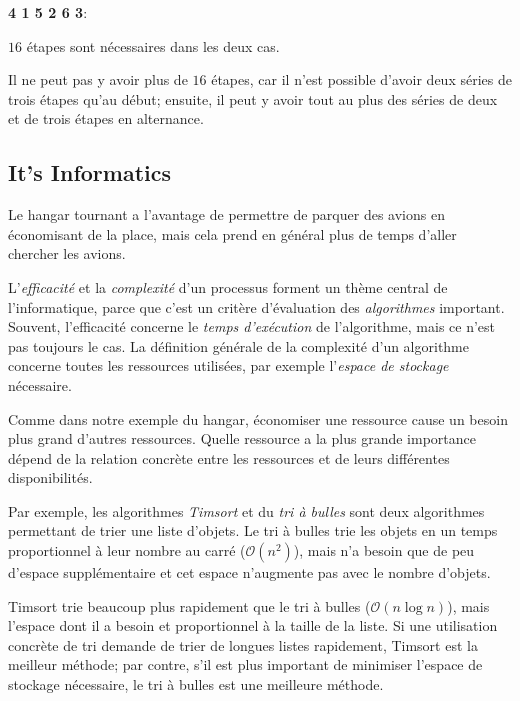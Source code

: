 \documentclass[a4paper,11pt]{report}
\newcommand{\taskGraphicsFolder}{..}
\begin{document}
\textbf{4 1 5 2 6 3}:

{\centering%
\par}

$16$ étapes sont nécessaires dans les deux cas.

Il ne peut pas y avoir plus de $16$ étapes, car il n’est possible d’avoir deux séries de trois étapes qu’au début; ensuite, il peut y avoir tout au plus des séries de deux et de trois étapes en alternance.


\subsection*{It’s Informatics}

Le hangar tournant a l’avantage de permettre de parquer des avions en économisant de la place, mais cela prend en général plus de temps d’aller chercher les avions.

L’\emph{efficacité} et la \emph{complexité} d’un processus forment un thème central de l’informatique, parce que c’est un critère d’évaluation des \emph{algorithmes} important. Souvent, l’efficacité concerne le \emph{temps d’exécution} de l’algorithme, mais ce n’est pas toujours le cas. La définition générale de la complexité d’un algorithme concerne toutes les ressources utilisées, par exemple l’\emph{espace de stockage} nécessaire.

Comme dans notre exemple du hangar, économiser une ressource cause un besoin plus grand d’autres ressources. Quelle ressource a la plus grande importance dépend de la relation concrète entre les ressources et de leurs différentes disponibilités.

Par exemple, les algorithmes \emph{Timsort} et du \emph{tri à bulles} sont deux algorithmes permettant de trier une liste d’objets. Le tri à bulles trie les objets en un temps proportionnel à leur nombre au carré (${\mathcal{O}(n^2)}$), mais n’a besoin que de peu d’espace supplémentaire et cet espace n’augmente pas avec le nombre d’objets.

Timsort trie beaucoup plus rapidement que le tri à bulles (${\mathcal{O}(n\log{}n)}$), mais l’espace dont il a besoin et proportionnel à la taille de la liste. Si une utilisation concrète de tri demande de trier de longues listes rapidement, Timsort est la meilleur méthode; par contre, s’il est plus important de minimiser l’espace de stockage nécessaire, le tri à bulles est une meilleure méthode.
\end{document}
